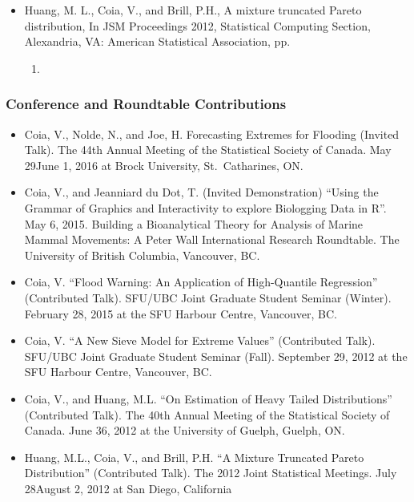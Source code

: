\documentclass[]{article}
\providecommand{\tightlist}{%
  \setlength{\itemsep}{0pt}\setlength{\parskip}{0pt}}
\begin{document}
\begin{itemize}
\tightlist
\item
  Huang, M. L., Coia, V., and Brill, P.H., A mixture truncated
  Pareto distribution, In JSM Proceedings 2012, Statistical Computing
  Section, Alexandria, VA: American Statistical Association, pp.

  \begin{enumerate}
  \def\labelenumi{\arabic{enumi}.}
  \setcounter{enumi}{24882497}
  \item
  \end{enumerate}
\end{itemize}

\hypertarget{conference-and-roundtable-contributions}{%
\subsubsection{Conference and Roundtable Contributions}\label{conference-and-roundtable-contributions}}

\begin{itemize}
\item
  Coia, V., Nolde, N., and Joe, H. Forecasting Extremes for Flooding
  (Invited Talk). The 44th Annual Meeting of the Statistical Society
  of Canada. May 29June 1, 2016 at Brock University, St.~Catharines,
  ON.
\item
  Coia, V., and Jeanniard du Dot, T. (Invited Demonstration) ``Using
  the Grammar of Graphics and Interactivity to explore Biologging Data
  in R''. May 6, 2015. Building a Bioanalytical Theory for Analysis of
  Marine Mammal Movements: A Peter Wall International Research
  Roundtable. The University of British Columbia, Vancouver, BC.
\item
  Coia, V. ``Flood Warning: An Application of High-Quantile Regression''
  (Contributed Talk). SFU/UBC Joint Graduate Student Seminar (Winter).
  February 28, 2015 at the SFU Harbour Centre, Vancouver, BC.
\item
  Coia, V. ``A New Sieve Model for Extreme Values'' (Contributed Talk).
  SFU/UBC Joint Graduate Student Seminar (Fall). September 29, 2012 at
  the SFU Harbour Centre, Vancouver, BC.
\item
  Coia, V., and Huang, M.L. ``On Estimation of Heavy Tailed
  Distributions'' (Contributed Talk). The 40th Annual Meeting of the
  Statistical Society of Canada. June 36, 2012 at the University of
  Guelph, Guelph, ON.
\item
  Huang, M.L., Coia, V., and Brill, P.H. ``A Mixture Truncated Pareto
  Distribution'' (Contributed Talk). The 2012 Joint Statistical
  Meetings. July 28August 2, 2012 at San Diego, California
\end{itemize}
\end{document}
